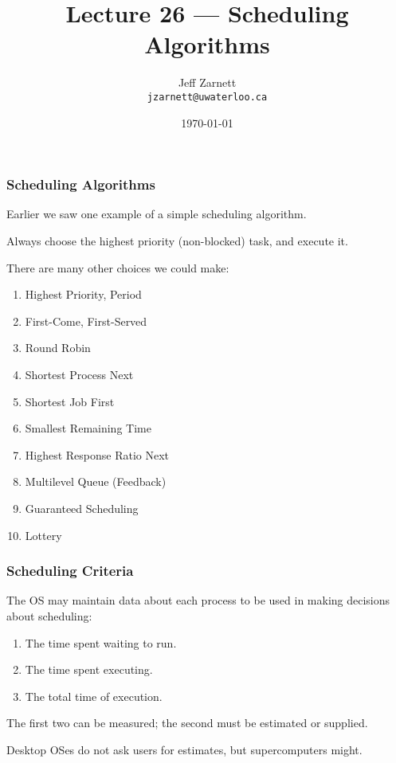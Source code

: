 

\title{Lecture 26 --- Scheduling Algorithms}

\author{Jeff Zarnett \\ \small \texttt{jzarnett@uwaterloo.ca}}
\date{\today}




\begin{frame}
  \titlepage

 \end{frame}



\begin{frame}
\frametitle{Scheduling Algorithms}

Earlier we saw one example of a simple scheduling algorithm. 

Always choose the highest priority (non-blocked) task, and execute it. 

There are many other choices we could make:
\begin{enumerate}
	\item Highest Priority, Period
	\item First-Come, First-Served
	\item Round Robin
	\item Shortest Process Next
	\item Shortest Job First
	\item Smallest Remaining Time
	\item Highest Response Ratio Next
	\item Multilevel Queue (Feedback)
	\item Guaranteed Scheduling
	\item Lottery
\end{enumerate}


\end{frame}

\begin{frame}
\frametitle{Scheduling Criteria}

The OS may maintain data about each process to be used in making decisions about scheduling:

\begin{enumerate}
	\item The time spent waiting to run.
	\item The time spent executing.
	\item The total time of execution.
\end{enumerate}

The first two can be measured; the second must be estimated or supplied.

Desktop OSes do not ask users for estimates, but supercomputers might.

\end{frame}

